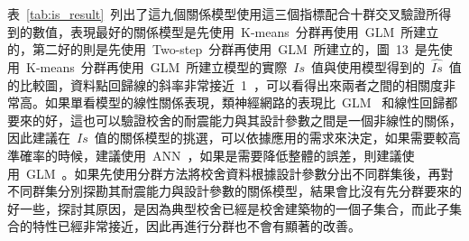 






表~\ref{tab:is_result}~列出了這九個關係模型使用這三個指標配合十群交叉驗證所得到的數值，表現最好的關係模型是先使用~K-means~分群再使用~GLM~所建立的，第二好的則是先使用~Two-step~分群再使用~GLM~所建立的，圖~13~是先使用~K-means~分群再使用~GLM~所建立模型的實際~$Is$~值與使用模型得到的~$\hat{Is}$~值的比較圖，資料點回歸線的斜率非常接近~1~，可以看得出來兩者之間的相關度非常高。如果單看模型的線性關係表現，類神經網路的表現比~GLM~ 和線性回歸都要來的好，這也可以驗證校舍的耐震能力與其設計參數之間是一個非線性的關係，因此建議在~$Is$~值的關係模型的挑選，可以依據應用的需求來決定，如果需要較高準確率的時候，建議使用~ANN~，如果是需要降低整體的誤差，則建議使用~GLM~。如果先使用分群方法將校舍資料根據設計參數分出不同群集後，再對不同群集分別探勘其耐震能力與設計參數的關係模型，結果會比沒有先分群要來的好一些，探討其原因，是因為典型校舍已經是校舍建築物的一個子集合，而此子集合的特性已經非常接近，因此再進行分群也不會有顯著的改善。

